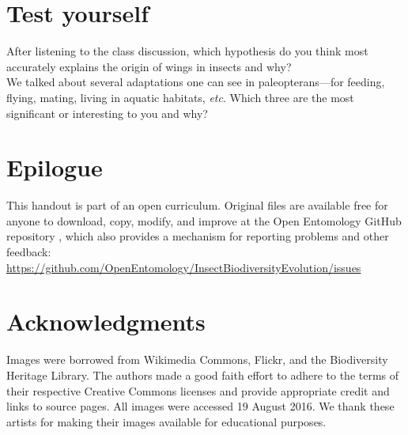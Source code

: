 \documentclass[letterpaper, 11pt]{article}
\begin{document}
\FloatBarrier
\section*{Test yourself}
\noindent{}After listening to the class discussion, which hypothesis do you think most accurately explains the origin of wings in insects and why?\\

\noindent{}We talked about several adaptations one can see in paleopterans---for feeding, flying, mating, living in aquatic habitats, \textit{etc}. Which three are the most significant or interesting to you and why?\\

\section*{Epilogue}
This handout is part of an open curriculum. Original files are available free for anyone to download, copy, modify, and improve at the Open Entomology GitHub repository \citep{ENT432}, which also provides a mechanism for reporting problems and other feedback:\\
\url{https://github.com/OpenEntomology/InsectBiodiversityEvolution/issues}

\section*{Acknowledgments}
Images were borrowed from Wikimedia Commons, Flickr, and the Biodiversity Heritage Library. The authors made a good faith effort to adhere to the terms of their respective Creative Commons licenses and provide appropriate credit and links to source pages. All images were accessed 19 August 2016. We thank these artists for making their images available for educational purposes.

\FloatBarrier


\end{document}
